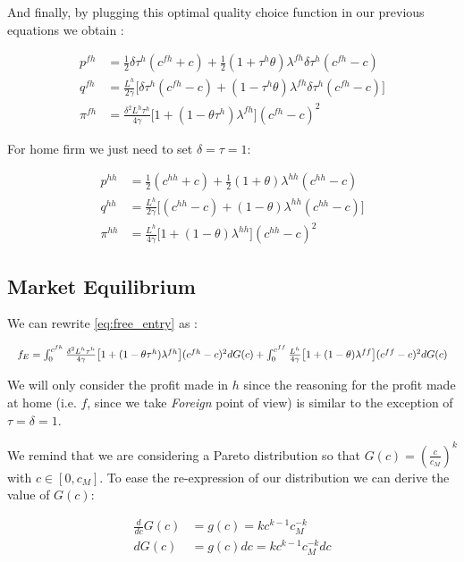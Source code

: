 And finally, by plugging this optimal quality choice function in our previous equations we obtain : 

\begin{align*}
    p^{fh} &= \frac{1}{2}\delta \tau^h ( c^{fh} +  c) + \frac{1}{2} (1 + \tau^h\theta)\lambda^{fh}\delta \tau^h(c^{fh} - c)  \\
    q^{fh} &= \frac{L^h}{2\gamma} \big[ \delta \tau^h ( c^{fh} -  c) + (1 - \tau^h\theta) \lambda^{fh}\delta \tau^h(c^{fh} - c)\big] \\
    \pi^{fh} &= \frac{\delta^2 L^h \tau^h}{4\gamma} \big[ 1 + (1 - \theta \tau^h)\lambda^{fh}\big](c^{fh} - c)^2
\end{align*}

For home firm we just need to set $\delta = \tau = 1$:

\begin{align*}
     p^{hh} &= \frac{1}{2}( c^{hh} +  c) + \frac{1}{2} (1 + \theta)\lambda^{hh}(c^{hh} - c)  \\
    q^{hh} &= \frac{L^h}{2\gamma} \big[( c^{hh} -  c) + (1 - \theta) \lambda^{hh}(c^{hh} - c)\big] \\
    \pi^{hh} &= \frac{L^h}{4\gamma} \big[ 1 + (1 - \theta )\lambda^{hh}\big](c^{hh} - c)^2
\end{align*}

\subsection{Market Equilibrium} \label{app:market_equilibrium}
We can rewrite \eqref{eq:free_entry} as :

\begin{equation*}
\resizebox{\textwidth}{!}{$
    f_E = \int_{0}^{c^{fh}} \frac{\delta^2 L^h \tau^h}{4\gamma} \big[ 1 + (1 - \theta \tau^h)\lambda^{fh}\big](c^{fh} - c)^2 dG(c) + \int_{0}^{c^{ff}} \frac{L^h}{4\gamma} \big[ 1 + (1 - \theta)\lambda^{ff}\big](c^{ff} - c)^2 dG(c) 
    $}
\end{equation*}

We will only consider the profit made in $h$ since the reasoning for the profit made at home (i.e. $f$, since we take \textit{Foreign} point of view) is similar to the exception of $\tau = \delta = 1$.

We remind that we are considering a Pareto distribution so that $G(c) = (\frac{c}{c_M})^k$ with $c \in [0,c_M]$. To ease the re-expression of our distribution we can derive the value of $G(c)$:

\begin{align*}
    \frac{d}{dc}G(c) &= g(c) = k c^{k-1}c_M^{-k} \\
    dG(c) &= g(c)dc = k c^{k-1}c_M^{-k} dc
\end{align*}

